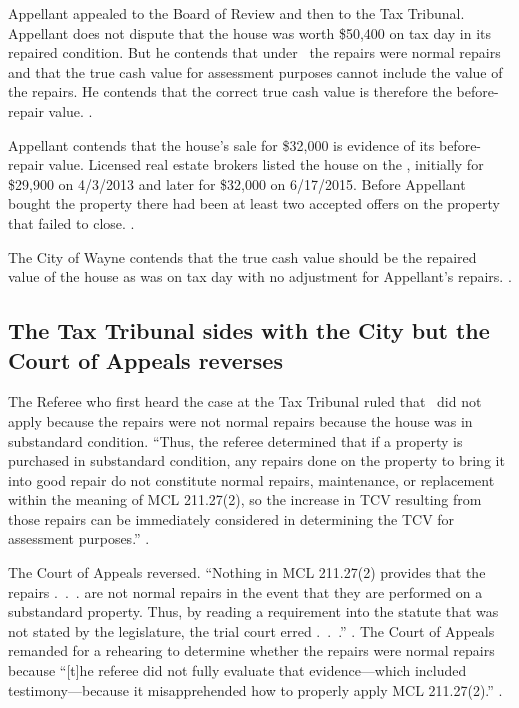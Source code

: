 \documentclass[12pt,\documentclassflag]{michiganCourtOfAppealsBrief}
\begin{document}
Appellant appealed to the Board of Review and then to the Tax Tribunal. Appellant does not dispute that the house was worth \$50,400 on tax day in its repaired condition. But he contends that under \mathieuGast\ the repairs were normal repairs and that the true cash value for assessment purposes cannot include the value of the repairs. He contends that the correct true cash value is therefore the before-repair value. \explanatoryLetter[].

Appellant contends that the house's sale for \$32,000 is evidence of its before-repair value. Licensed real estate brokers listed the house on the \MLS, initially for \$29,900 on 4/3/2013 and later for \$32,000 on 6/17/2015. Before Appellant bought the property there had been at least two accepted offers on the property that failed to close. \mlsHistory[]. 

The City of Wayne contends that the true cash value should be the repaired value of the house as was on tax day with no adjustment for Appellant's repairs. \cityEvidence.

\subsection{The Tax Tribunal sides with the City but the Court of Appeals reverses}

The Referee who first heard the case at the Tax Tribunal ruled that \mathieuGast\ did not apply because the repairs were not normal repairs because the house was in substandard condition. ``Thus, the referee determined that if a property is purchased in substandard condition, any repairs
done on the property to bring it into good repair do not constitute normal repairs, maintenance, or
replacement within the meaning of MCL 211.27(2), so the increase in TCV resulting from those
repairs can be immediately considered in determining the TCV for assessment purposes.'' .

The Court of Appeals reversed. ``Nothing in MCL 211.27(2) provides that the repairs .~.~. are not normal repairs in the event that they are performed on a substandard property. Thus, by reading a requirement into the statute that was not stated by the legislature, the trial court erred .~.~.'' . The Court of Appeals remanded for a rehearing to determine whether the repairs were normal repairs because ``[t]he referee did not fully evaluate that evidence---which included testimony---because it misapprehended how to properly apply MCL 211.27(2).'' .
\end{document}
